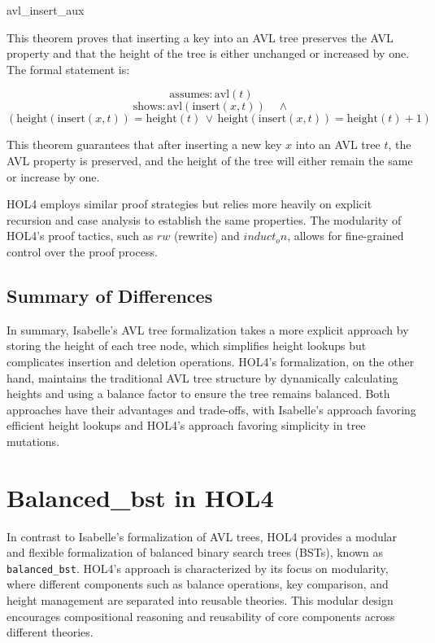 \begin{thm}{avl\_insert\_aux}
	
	This theorem proves that inserting a key into an AVL tree preserves the AVL property and that the height of the tree is either unchanged or increased by one. The formal statement is:
	
	\[
	\text{assumes:} \, \text{avl}(t)
	\]
	\[
	\text{shows:} \, \text{avl}(\text{insert}(x, t)) \quad \land
	\]
	\[
	\left( \text{height}(\text{insert}(x, t)) = \text{height}(t) \, \lor \, 
	\text{height}(\text{insert}(x, t)) = \text{height}(t) + 1 \right)
	\]
	
	This theorem guarantees that after inserting a new key \( x \) into an AVL tree \( t \), the AVL property is preserved, and the height of the tree will either remain the same or increase by one.
	
\end{thm}
HOL4 employs similar proof strategies but relies more heavily on explicit recursion and case analysis to establish the same properties. The modularity of HOL4’s proof tactics, such as \(rw\) (rewrite) and \(induct_on\), allows for fine-grained control over the proof process.

\subsection{Summary of Differences}
In summary, Isabelle’s AVL tree formalization takes a more explicit approach by storing the height of each tree node, which simplifies height lookups but complicates insertion and deletion operations. HOL4’s formalization, on the other hand, maintains the traditional AVL tree structure by dynamically calculating heights and using a balance factor to ensure the tree remains balanced. Both approaches have their advantages and trade-offs, with Isabelle’s approach favoring efficient height lookups and HOL4’s approach favoring simplicity in tree mutations.

\section{Balanced\_bst in HOL4}

In contrast to Isabelle’s formalization of AVL trees, HOL4 \cite{HOLBalancedBST} provides a modular and flexible formalization of balanced binary search trees (BSTs), known as \texttt{balanced\_bst}. HOL4's approach is characterized by its focus on modularity, where different components such as balance operations, key comparison, and height management are separated into reusable theories. This modular design encourages compositional reasoning and reusability of core components across different theories.

